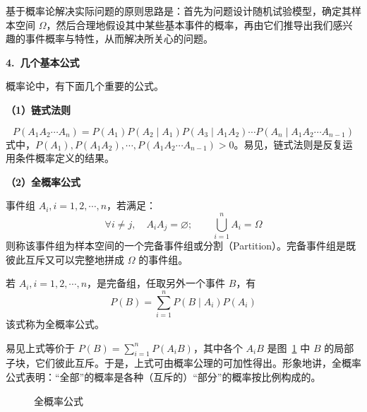 \documentclass[11pt,openany,UTF8]{ctexbook}
\newcommand{\bhead}[1]{\par\medskip\noindent\textbf{#1}\par\smallskip}
\begin{document}
基于概率论解决实际问题的原则思路是\nobreak：首先为问题设计随机试验模型\nobreak，确定其样本空间 $\Omega$\nobreak，然后合理地假设其中某些基本事件的概率\nobreak，再由它们推导出我们感兴趣的事件概率与特性\nobreak，从而解决所关心的问题\nobreak。

\bhead{4.\ 几个基本公式}
概率论中\nobreak，有下面几个重要的公式\nobreak。

\bhead{（1\nobreak）链式法则}
\begin{equation}
P(A_1A_2\cdots A_n)=P(A_1)P(A_2\mid A_1)P(A_3\mid A_1A_2)\cdots P(A_n\mid A_1A_2\cdots A_{n-1})
\label{eq:1.4}
\end{equation}
式中\nobreak，$P(A_1),P(A_1A_2),\cdots,P(A_1A_2\cdots A_{n-1})>0$\nobreak。易见\nobreak，链式法则是反复运用条件概率定义的结果\nobreak。

\bhead{（2\nobreak）全概率公式}
事件组 $A_i,i=1,2,\cdots,n$\nobreak，若满足\nobreak：
\[
\forall i\neq j,\quad A_iA_j=\varnothing;\qquad \bigcup_{i=1}^{n}A_i=\Omega
\]
则称该事件组为样本空间的一个完备事件组或分割（Partition\nobreak）\nobreak。完备事件组是既彼此互斥又可以完整地拼成 $\Omega$ 的事件组\nobreak。

若 $A_i,i=1,2,\cdots,n$\nobreak，是完备组\nobreak，任取另外一个事件 $B$\nobreak，有
\begin{equation}
P(B)=\sum_{i=1}^{n}P(B\mid A_i)P(A_i)
\label{eq:1.5}
\end{equation}
该式称为全概率公式\nobreak。

易见上式等价于 $P(B)=\sum\limits_{i=1}^{n}P(A_iB)$\nobreak，其中各个 $A_iB$ 是图~\ref{fig:1.3} 中 $B$ 的局部子块\nobreak，它们彼此互斥\nobreak。于是\nobreak，上式可由概率公理的可加性得出\nobreak。形象地讲\nobreak，全概率公式表明\nobreak：“全部”的概率是各种（互斥的\nobreak）“部分”的概率按比例构成的\nobreak。

\begin{figure}[htbp]
  \centering
  \caption{全概率公式}
  \label{fig:1.3}
\end{figure}
\end{document}
